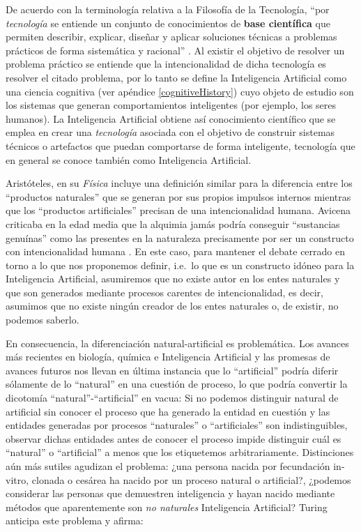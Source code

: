 \documentclass[12pt]{memoir}
\begin{document}
De acuerdo con la terminología relativa a la Filosofía de la Tecnología, ``por \textit{tecnología} se entiende un conjunto de conocimientos de \textbf{base científica} que permiten describir, explicar, diseñar y aplicar soluciones técnicas a problemas prácticos de forma sistemática y racional'' \parencite[p. 2]{quintanillaRef}. Al existir el objetivo de resolver un problema práctico se entiende que la intencionalidad de dicha tecnología es resolver el citado problema, por lo tanto se define la Inteligencia Artificial como una ciencia cognitiva (ver apéndice \ref{cognitiveHistory}) cuyo objeto de estudio son los sistemas que generan comportamientos inteligentes (por ejemplo, los seres humanos). La Inteligencia Artificial obtiene así conocimiento científico que se emplea en crear una \textit{tecnología} asociada con el objetivo de construir sistemas técnicos o artefactos que puedan comportarse de forma inteligente, tecnología que en general se conoce también como Inteligencia Artificial.

Aristóteles, en su \textit{Física} incluye una definición similar para la diferencia entre los ``productos naturales'' que se generan por sus propios impulsos internos mientras que los ``productos artificiales'' precisan de una intencionalidad humana. Avicena criticaba en la edad media que la alquimia jamás podría conseguir ``sustancias genuínas'' como las presentes en la naturaleza precisamente por ser un constructo con intencionalidad humana \parencite[apartado 1.1]{sep-technology}. En este caso, para mantener el debate cerrado en torno a lo que nos proponemos definir, i.e.\ lo que es un constructo idóneo para la Inteligencia Artificial, asumiremos que no existe autor en los entes naturales y que son generados mediante procesos carentes de intencionalidad, es decir, asumimos que no existe ningún creador de los entes naturales o, de existir, no podemos saberlo.

En consecuencia, la diferenciación natural-artificial es problemática. Los avances más recientes en biología, química e Inteligencia Artificial y las promesas de avances futuros nos llevan en última instancia que lo ``artificial'' podría diferir sólamente de lo ``natural'' en una cuestión de proceso, lo que podría convertir la dicotomía ``natural''-``artificial'' en vacua: Si no podemos distinguir natural de artificial sin conocer el proceso que ha generado la entidad en cuestión y las entidades generadas por procesos ``naturales'' o ``artificiales'' son indistinguibles, observar dichas entidades antes de conocer el proceso impide distinguir cuál es ``natural'' o ``artificial'' a menos que los etiquetemos arbitrariamente. Distinciones aún más sutiles agudizan el problema: ¿una persona nacida por fecundación in-vitro, clonada o cesárea ha nacido por un proceso natural o artificial?, ¿podemos considerar las personas que demuestren inteligencia y hayan nacido mediante métodos que aparentemente son \textit{no naturales} Inteligencia Artificial? Turing anticipa este problema y afirma:
\end{document}
